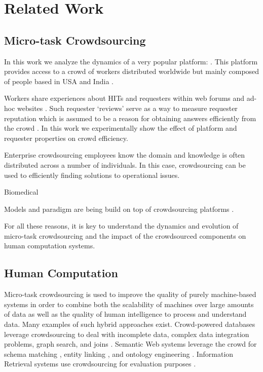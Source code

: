 \section{Related Work}\label{sec:relwork}

\subsection{Micro-task Crowdsourcing}

In this work we analyze the dynamics of a  very popular platform: \amt. This platform provides access to a crowd of workers distributed worldwide but mainly composed of people based in USA and India \cite{mturk}.

Workers share experiences about HITs and requesters within web forums and ad-hoc websites \cite{turkopticon}. Such requester `reviews' serve as a way to measure requester reputation which is assumed to be a reason for obtaining answers efficiently from the crowd \cite{}. In this work we experimentally show the effect of platform and requester properties on crowd efficiency.  

Enterprise crowdsourcing \cite{enterprisecrowdsourcing} employees know the domain and knowledge is often distributed across a number of individuals. In this case, crowdsourcing can be used to efficiently finding solutions to operational issues.

Biomedical \cite{biomedical}


Models and paradigm are being build on top of crowdsourcing platforms \cite{crowdcomputer}.

For all these reasons, it is key to understand the dynamics and evolution of micro-task crowdsourcing and the impact of the crowdsourced components on human computation systems.

\subsection{Human Computation}
Micro-task crowdsourcing is used to improve the quality of purely machine-based systems in order to combine both the scalability of machines over large amounts of data as well as the quality of human intelligence to process and understand data.
Many examples of such hybrid approaches exist.
Crowd-powered databases \cite{crowddb} leverage crowdsourcing to deal with incomplete data, complex data integration problems, graph search, and joins \cite{crowder,graphsearch,crowdjoins}.
Semantic Web systems leverage the crowd for schema matching \cite{crowdmap}, entity linking \cite{zencrowd}, and ontology engineering \cite{bioonto}.
Information Retrieval systems use crowdsourcing for evaluation purposes \cite{mizzaroalonso}.

